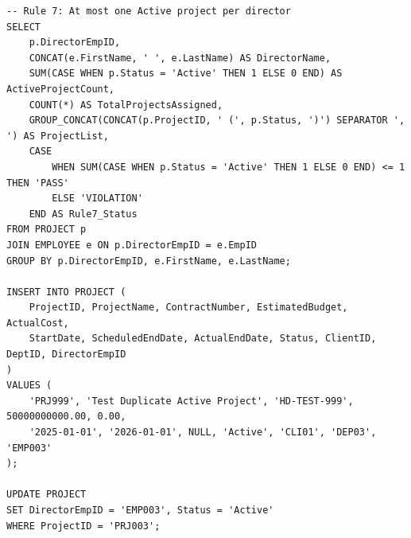 \documentclass[a4paper,12pt]{report}
\begin{document}
\begin{lstlisting}
-- Rule 7: At most one Active project per director
SELECT 
    p.DirectorEmpID,
    CONCAT(e.FirstName, ' ', e.LastName) AS DirectorName,
    SUM(CASE WHEN p.Status = 'Active' THEN 1 ELSE 0 END) AS ActiveProjectCount,
    COUNT(*) AS TotalProjectsAssigned,
    GROUP_CONCAT(CONCAT(p.ProjectID, ' (', p.Status, ')') SEPARATOR ', ') AS ProjectList,
    CASE 
        WHEN SUM(CASE WHEN p.Status = 'Active' THEN 1 ELSE 0 END) <= 1 THEN 'PASS'
        ELSE 'VIOLATION'
    END AS Rule7_Status
FROM PROJECT p
JOIN EMPLOYEE e ON p.DirectorEmpID = e.EmpID
GROUP BY p.DirectorEmpID, e.FirstName, e.LastName;

INSERT INTO PROJECT (
    ProjectID, ProjectName, ContractNumber, EstimatedBudget, ActualCost,
    StartDate, ScheduledEndDate, ActualEndDate, Status, ClientID, DeptID, DirectorEmpID
)
VALUES (
    'PRJ999', 'Test Duplicate Active Project', 'HD-TEST-999', 50000000000.00, 0.00,
    '2025-01-01', '2026-01-01', NULL, 'Active', 'CLI01', 'DEP03', 'EMP003'
);

UPDATE PROJECT
SET DirectorEmpID = 'EMP003', Status = 'Active'
WHERE ProjectID = 'PRJ003';
\end{lstlisting}
\end{document}
